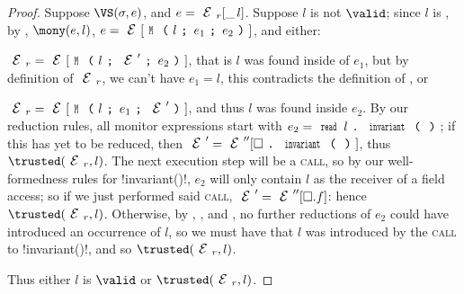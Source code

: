 \begin{proof}
\noindent Suppose $\VS(\s, e)$, and $e = \ER[\_\,l]$. Suppose $l$ is not $\valid$; since $l$ is \reach, by , $\mony(e,l)$, $e = \E[\M{l}{e_1}{e_2}]$, and either:
\begin{iitemize}
	\item $\ER = \E[\M{l}{\E'}{e_2}]$, that is $l$ was found inside of $e_1$, but by definition of $\ER$, we can't have $e_1 = l$, this contradicts the definition of \mony, or
	\item $\ER = \E[\M{l}{e_1}{\E'}]$, and thus $l$ was found inside $e_2$. By our reduction rules, all monitor expressions start with $e_2=\invariant{l}$; if this has yet to be reduced, then $\E' = \E''[\call{\hole}{\Kw{invariant}}{}]$, thus $\trusted(\ER, l)$. The next execution step will be a \textsc{call}, so by our well-formedness rules for \Q!invariant()!, $e_2$ will only contain $l$ as the receiver of a field access; so if we just performed said \textsc{call}, $\E' = \E''[\hole.f]$: hence $\trusted(\ER, l)$. Otherwise, by , , and \RNC, no further reductions of $e_2$ could have introduced an occurrence of $l$, so we must have that $l$ was introduced by the \textsc{call} to \Q!invariant()!, and so $\trusted(\ER, l)$.
\end{iitemize}
Thus either $l$ is $\valid$ or $\trusted(\ER, l)$.
\end{proof}

\lstset{language=FortyThree} %